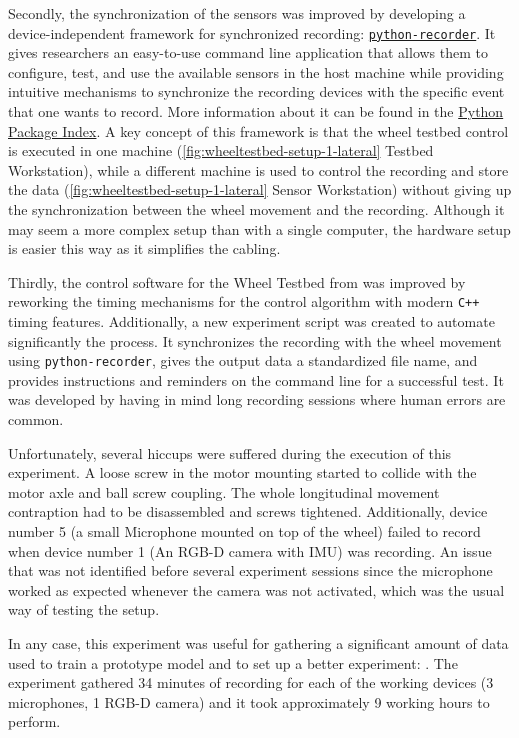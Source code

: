 Secondly, the synchronization of the sensors was improved by developing a
device-independent framework for synchronized recording:
\href{https://github.com/AcousticOdometry/python-recorder}{\texttt{python-recorder}}.
It gives researchers an easy-to-use command line application that allows them
to configure, test, and use the available sensors in the host machine while
providing intuitive mechanisms to synchronize the recording devices with the
specific event that one wants to record. More information about it can be found
in the \href{https://pypi.org/project/python-recorder/}{Python Package Index}.
A key concept of this framework is that the wheel testbed control is executed
in one machine (\cref{fig:wheeltestbed-setup-1-lateral} Testbed Workstation),
while a different machine is used to control the recording and store the data
(\cref{fig:wheeltestbed-setup-1-lateral} Sensor Workstation) without giving up
the synchronization between the wheel movement and the recording. Although it
may seem a more complex setup than with a single computer, the hardware setup
is easier this way as it simplifies the cabling.

Thirdly, the control software for the Wheel Testbed from \SRG{} was improved by
reworking the timing mechanisms for the control algorithm with modern
\texttt{C++} timing features. Additionally, a new experiment script was created
to automate significantly the process. It synchronizes the recording with the
wheel movement using \texttt{python-recorder}, gives the output data a
standardized file name, and provides instructions and reminders on the command
line for a successful test. It was developed by having in mind long recording
sessions where human errors are common.

Unfortunately, several hiccups were suffered during the execution of this
experiment. A loose screw in the motor mounting started to collide with the
motor axle and ball screw coupling. The whole longitudinal movement contraption
had to be disassembled and screws tightened. Additionally, device number 5 (a
small Microphone mounted on top of the wheel) failed to record when device
number 1 (An RGB-D camera with IMU) was recording. An issue that was not
identified before several experiment sessions since the microphone worked as
expected whenever the camera was not activated, which was the usual way of
testing the setup.

In any case, this experiment was useful for gathering a significant amount of
data used to train a prototype model and to set up a better experiment:
. The experiment gathered 34 minutes
of recording for each of the working devices (3 microphones, 1 RGB-D camera)
and it took approximately 9 working hours to perform.